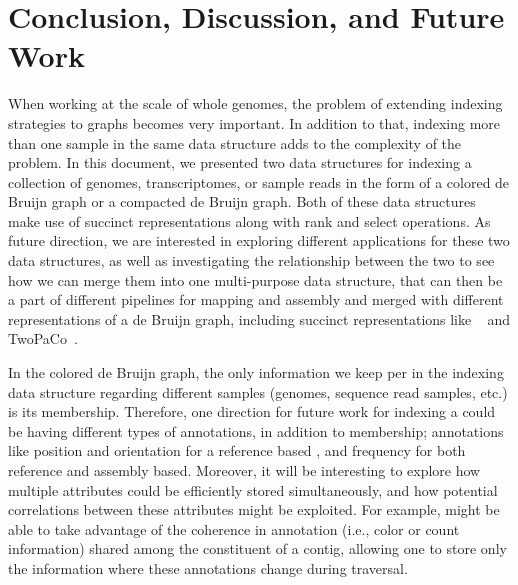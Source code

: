 \chapter{Conclusion, Discussion, and Future Work}

When working at the scale of whole genomes, the problem of extending indexing strategies to graphs becomes very important. In addition to that, indexing more than one sample in the same data structure adds to the complexity of the problem. In this document, we presented two data structures for indexing a collection of genomes, transcriptomes, or sample reads in the form of a colored de Bruijn graph or a compacted de Bruijn graph. Both of these data structures make use of succinct representations along with rank and select operations. As future direction, we are interested in exploring different applications for these two data structures, as well as investigating the relationship between the two to see how we can merge them into one multi-purpose data structure, that can then be a part of different pipelines for mapping and assembly and merged with different representations of a de Bruijn graph, including succinct representations like \boss~\cite{BoweOn12} and TwoPaCo~\cite{minkin2016twopaco}.

In the colored de Bruijn graph, the only information we keep per \kmer in the indexing data structure regarding different samples (genomes, sequence read samples, etc.) is its membership. Therefore, one direction for future work for indexing a \cdbg could be having different types of annotations, in addition to membership; annotations like position and orientation for a reference based \cdbg, and frequency for both reference and assembly based. Moreover, it will be interesting to explore how multiple attributes could be efficiently stored simultaneously, and how potential correlations between these attributes might be exploited. For example, might be able to take advantage of the coherence in annotation (i.e., color or count information) shared among the constituent \kmers of a contig, allowing one to store only the information where these annotations change during traversal.

